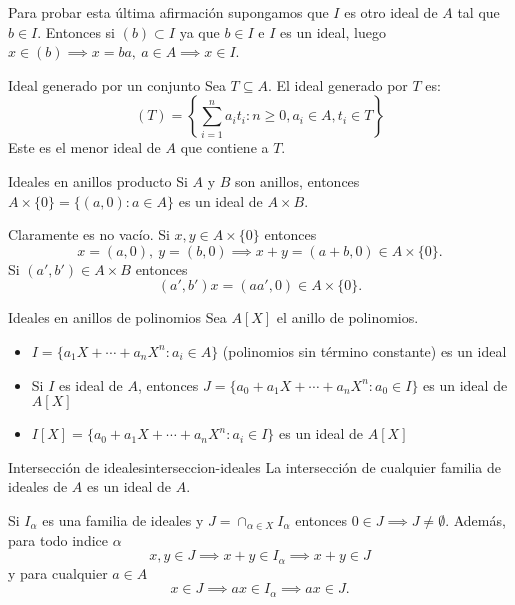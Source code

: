 Para probar esta última afirmación supongamos que $I$ es otro ideal de $A$ tal que $b \in I$. Entonces si $(b) \subset I$ ya que $b \in I$ e $I$ es un ideal, luego $x \in (b) \implies x = ba,\ a \in A \implies x \in I$.

\clearpage

\begin{example}{Ideal generado por un conjunto}{}
    Sea \(T \subseteq A\). El {ideal generado por \(T\)} es:
    \[
    (T) = \left\{\sum_{i=1}^n a_i t_i : n \geq 0, a_i \in A, t_i \in T\right\}
    \]
    Este es el menor ideal de \(A\) que contiene a \(T\).
\end{example}

\begin{example}{Ideales en anillos producto}{}
    Si \(A\) y \(B\) son anillos, entonces \(A \times \{0\} = \{(a, 0) : a \in A\}\) es un ideal de \(A \times B\).
\end{example}

\begin{proofbox}
    Claramente es no vacío. Si $x,y \in A \times \{0\}$ entonces 
    \[
    x = (a,0),\ y = (b,0) \implies x + y = (a+b, 0) \in A \times \{0\}.
    \]
    Si $(a',b') \in A \times B$ entonces 
    \[
    (a',b')x = (aa',0) \in A \times \{0\}.
    \]
\end{proofbox}

\begin{example}{Ideales en anillos de polinomios}{}
    Sea \(A[X]\) el anillo de polinomios.
    \begin{itemize}
        \item \(I = \{a_1X + \cdots + a_nX^n : a_i \in A\}\) (polinomios sin término constante) es un ideal
        \item Si \(I\) es ideal de \(A\), entonces \(J = \{a_0 + a_1X + \cdots + a_nX^n : a_0 \in I\}\) es un ideal de \(A[X]\)
        \item \(I[X] = \{a_0 + a_1X + \cdots + a_nX^n : a_i \in I\}\) es un ideal de \(A[X]\)
    \end{itemize}
\end{example}

\begin{proposition}{Intersección de ideales}{interseccion-ideales}
    La intersección de cualquier familia de ideales de \(A\) es un ideal de \(A\).
\end{proposition}

\begin{proofbox}
    Si $I_\alpha$ es una familia de ideales y $J = \cap_{\alpha \in X} I_\alpha$ entonces $0 \in J \implies J \neq \emptyset$. Además, para todo indice $\alpha$
    \[
    x,y \in J \implies x+y \in I_\alpha \implies x+y \in J
    \]
    y para cualquier $a \in A$
    \[
    x \in J \implies ax \in I_\alpha \implies ax \in J.
    \]
\end{proofbox}

